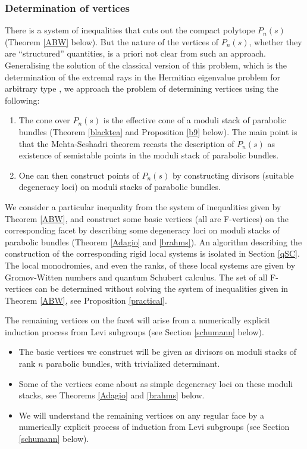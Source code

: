 \documentclass[11pt]{amsart}
\numberwithin{theorem}{subsection}
\begin{document}
\subsubsection{Determination of vertices}\label{review}
There is a system of inequalities that cuts out the compact polytope $P_n(s)$ (Theorem \ref{ABW}
below). But the nature of the vertices of $P_n(s)$, whether they are ``structured'' quantities, is a priori not clear
from such an approach. Generalising the solution of the classical version of this problem, which is the determination of the extremal rays in the Hermitian eigenvalue problem for arbitrary type \cite{BHermit,BKiers,Kiers}, we approach the problem of determining vertices using the following:
\begin{enumerate}
\item The cone over $P_n(s)$ is the effective cone of a moduli stack of parabolic bundles (Theorem \ref{blacktea} and Proposition \ref{b9} below). The main point is that the Mehta-Seshadri theorem
recasts the description of $P_n(s)$  as existence of semistable points in the moduli stack of parabolic bundles.
\item One can then construct points of $P_n(s)$ by constructing divisors (suitable degeneracy loci)  on moduli stacks of parabolic bundles.
\end{enumerate}
We consider a particular inequality from the system of inequalities given by Theorem \ref{ABW}, and construct some basic vertices (all are F-vertices)  on the corresponding facet  by describing some degeneracy loci on moduli stacks of parabolic bundles (Theorem \ref{Adagio} and \ref{brahms}). An algorithm describing the construction of the corresponding rigid local systems is isolated in Section \ref{qSC}. The local monodromies, and even the ranks, of these local systems are given by Gromov-Witten numbers and quantum Schubert calculus. The set of all F-vertices can be determined without solving the system of inequalities given in Theorem \ref{ABW}, see Proposition \ref{practical}.

The remaining vertices on the facet will arise from a numerically explicit induction process from Levi subgroups (see Section \ref{schumann} below).

\iffalse
\begin{itemize}
\item  The basic vertices we construct will be given as divisors on  moduli stacks of rank $n$ parabolic bundles, with trivialized determinant.
\item Some of the vertices come about as simple degeneracy loci on these moduli stacks, see Theorems \ref{Adagio} and \ref{brahms} below.
\item We will understand the remaining vertices on any regular face by a numerically explicit process of induction from Levi subgroups (see Section \ref{schumann} below).
\end{itemize}
\end{document}

